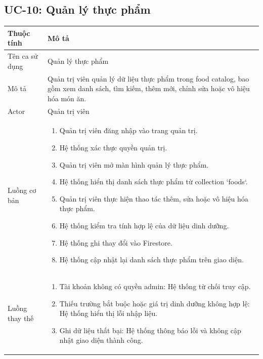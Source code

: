 \subsection{UC-10: Quản lý thực phẩm}

\begin{longtable}{|p{4cm}|p{11cm}|}
    \hline
    \textbf{Thuộc tính} & \textbf{Mô tả} \\
    \hline
    \endhead
    \hline
    \endfoot
    Tên ca sử dụng & Quản lý thực phẩm \\
    \hline
    Mô tả & Quản trị viên quản lý dữ liệu thực phẩm trong food catalog, bao gồm xem danh sách, tìm kiếm, thêm mới, chỉnh sửa hoặc vô hiệu hóa món ăn. \\
    \hline
    Actor & Quản trị viên \\
    \hline
    Luồng cơ bản &
        \begin{enumerate}[nosep]
            \item Quản trị viên đăng nhập vào trang quản trị.
            \item Hệ thống xác thực quyền quản trị.
            \item Quản trị viên mở màn hình quản lý thực phẩm.
            \item Hệ thống hiển thị danh sách thực phẩm từ collection `foods`.
            \item Quản trị viên thực hiện thao tác thêm, sửa hoặc vô hiệu hóa thực phẩm.
            \item Hệ thống kiểm tra tính hợp lệ của dữ liệu dinh dưỡng.
            \item Hệ thống ghi thay đổi vào Firestore.
            \item Hệ thống cập nhật lại danh sách thực phẩm trên giao diện.
        \end{enumerate} \\
    \hline
    Luồng thay thế &
        \begin{enumerate}[nosep]
            \item[2a.] Tài khoản không có quyền admin: Hệ thống từ chối truy cập.
            \item[6a.] Thiếu trường bắt buộc hoặc giá trị dinh dưỡng không hợp lệ: Hệ thống hiển thị lỗi nhập liệu.
            \item[7a.] Ghi dữ liệu thất bại: Hệ thống thông báo lỗi và không cập nhật giao diện thành công.
        \end{enumerate} \\

\end{longtable}
